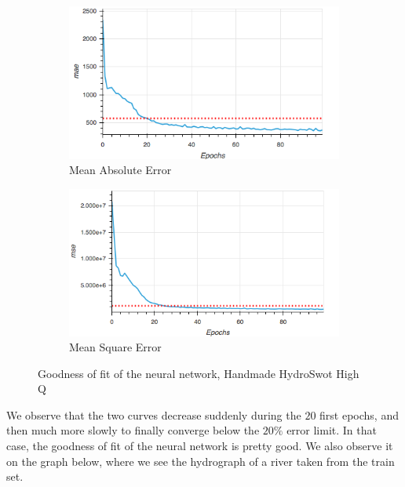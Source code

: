 \begin{figure}[H]
    \begin{subfigure}{0.45 \textwidth}
        \centering
        \includegraphics[scale = 0.45]{Graph/MAE_hydroHQ.png}
        \caption{Mean Absolute Error}
       
    \end{subfigure}
    \centering
     \begin{subfigure}{0.45 \textwidth}
         \centering
        \includegraphics[scale = 0.45]{Graph/MSE_hydroHQ.png}
        \caption{Mean Square Error}
       
     \end{subfigure}
 
 \caption{Goodness of fit of the neural network, Handmade HydroSwot High Q}
 \label{feig:metricANN}
\end{figure}

We observe that the two curves decrease suddenly during the $20$ first epochs, and then much more slowly to finally converge below the $20\%$ error limit. In that case, the goodness of fit of the neural network is pretty good. We also observe it on the graph below, where we see the hydrograph of a river taken from the train set.

